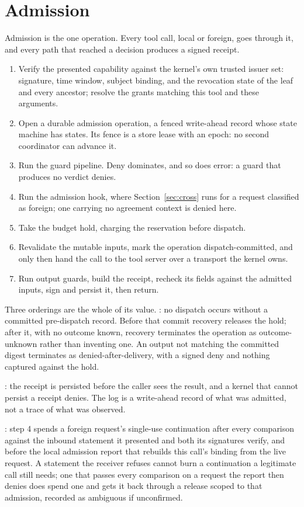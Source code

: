 \section{Admission}
\label{sec:admission}

Admission is the one operation. Every tool call, local or foreign, goes through
it, and every path that reached a decision produces a signed receipt.

\begin{enumerate}\itemsep0pt
\item Verify the presented capability against the kernel's own trusted issuer
  set: signature, time window, subject binding, and the revocation state of the
  leaf and every ancestor; resolve the grants matching this tool and these
  arguments.
\item Open a durable admission operation, a fenced write-ahead record whose
  state machine has \PSAdmissionStateCount{} states. Its fence is a store lease
  with an epoch: no second coordinator can advance it.
\item Run the guard pipeline. Deny dominates, and so does error: a guard that
  produces no verdict denies.
\item Run the admission hook, where Section~\ref{sec:cross} runs for a request
  classified as foreign; one carrying no agreement context is denied here.
\item Take the budget hold, charging the reservation before dispatch.
\item Revalidate the mutable inputs, mark the operation dispatch-committed, and
  only then hand the call to the tool server over a transport the kernel owns.
\item Run output guards, build the receipt, recheck its fields against the
  admitted inputs, sign and persist it, then return.
\end{enumerate}

Three orderings are the whole of its value. : no
dispatch occurs without a committed pre-dispatch record. Before that commit
recovery releases the hold; after it, with no outcome known, recovery terminates
the operation as outcome-unknown rather than inventing one. An output not
matching the committed digest terminates as denied-after-delivery, with a signed
deny and nothing captured against the hold.

: the receipt is persisted before the caller sees
the result, and a kernel that cannot persist a receipt denies. The log is a
write-ahead record of what was admitted, not a trace of what was observed.

: step 4 spends a foreign request's single-use
continuation after every comparison against the inbound statement it presented
and both its signatures verify, and before the local admission report that
rebuilds this call's binding from the live request. A statement the receiver
refuses cannot burn a continuation a legitimate call still needs; one that
passes every comparison on a request the report then denies does spend one and
gets it back through a release scoped to that admission, recorded as ambiguous
if unconfirmed.
